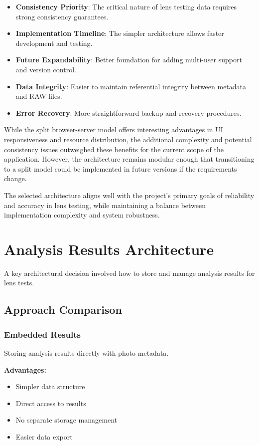 \begin{itemize}
    \item \textbf{Consistency Priority}: The critical nature of lens testing data requires strong consistency guarantees.
    \item \textbf{Implementation Timeline}: The simpler architecture allows faster development and testing.
    \item \textbf{Future Expandability}: Better foundation for adding multi-user support and version control.
    \item \textbf{Data Integrity}: Easier to maintain referential integrity between metadata and RAW files.
    \item \textbf{Error Recovery}: More straightforward backup and recovery procedures.
\end{itemize}

While the split browser-server model offers interesting advantages in UI responsiveness and resource distribution, the additional complexity and potential consistency issues outweighed these benefits for the current scope of the application. However, the architecture remains modular enough that transitioning to a split model could be implemented in future versions if the requirements change.

The selected architecture aligns well with the project's primary goals of reliability and accuracy in lens testing, while maintaining a balance between implementation complexity and system robustness.

\section{Analysis Results Architecture}

A key architectural decision involved how to store and manage analysis results for lens tests.

\subsection{Approach Comparison}

\subsubsection{Embedded Results}
Storing analysis results directly with photo metadata.

\textbf{Advantages:}
\begin{itemize}
    \item Simpler data structure
    \item Direct access to results
    \item No separate storage management
    \item Easier data export
\end{itemize}

